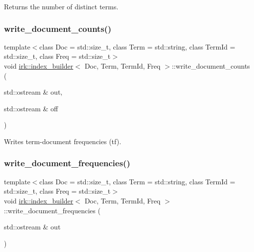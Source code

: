 Returns the number of distinct terms. 

\mbox{\label{classirk_1_1index__builder_a69082abb251ed664e6ba7550995c8cf6}} 
\subsubsection{\texorpdfstring{write\+\_\+document\+\_\+counts()}{write\_document\_counts()}}
{\footnotesize\ttfamily template$<$class Doc  = std\+::size\+\_\+t, class Term  = std\+::string, class Term\+Id  = std\+::size\+\_\+t, class Freq  = std\+::size\+\_\+t$>$ \\
void \mbox{\hyperlink{classirk_1_1index__builder}{irk\+::index\+\_\+builder}}$<$ Doc, Term, Term\+Id, Freq $>$\+::write\+\_\+document\+\_\+counts (\begin{DoxyParamCaption}\item[{std\+::ostream \&}]{out,  }\item[{std\+::ostream \&}]{off }\end{DoxyParamCaption})\hspace{0.3cm}{\ttfamily [inline]}}



Writes term-\/document frequencies (tf). 

\mbox{\label{classirk_1_1index__builder_a10f84fb4c00cea77259d275fc47635ed}} 
\subsubsection{\texorpdfstring{write\+\_\+document\+\_\+frequencies()}{write\_document\_frequencies()}}
{\footnotesize\ttfamily template$<$class Doc  = std\+::size\+\_\+t, class Term  = std\+::string, class Term\+Id  = std\+::size\+\_\+t, class Freq  = std\+::size\+\_\+t$>$ \\
void \mbox{\hyperlink{classirk_1_1index__builder}{irk\+::index\+\_\+builder}}$<$ Doc, Term, Term\+Id, Freq $>$\+::write\+\_\+document\+\_\+frequencies (\begin{DoxyParamCaption}\item[{std\+::ostream \&}]{out }\end{DoxyParamCaption})\hspace{0.3cm}{\ttfamily [inline]}}



